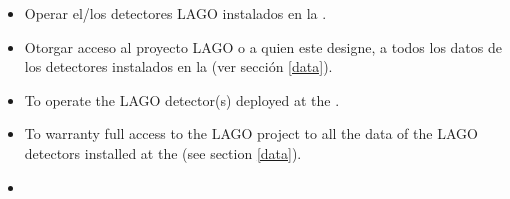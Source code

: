 \begin{itemize}
  \ifes
    \item Operar el/los detectores LAGO instalados en la \institution.
    \item Otorgar acceso al proyecto LAGO o a quien este designe, a todos los datos de los detectores instalados en la \institution (ver sección \ref{data}).
  \fi
  \ifen
    \item To operate the LAGO detector(s) deployed at the \institution.
    \item To warranty full access to the LAGO project to all the data of the LAGO detectors installed at the \institution (see section \ref{data}).
  \fi
  \ifpt
    \item
  \fi
\end{itemize}
